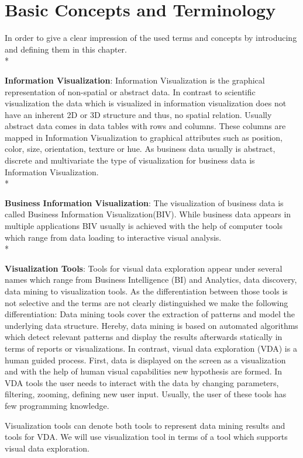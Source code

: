 \chapter{Basic Concepts and Terminology}
\label{concepts}
In order to give a clear impression of the used terms and concepts by introducing and defining them in this chapter.\\*

\textbf{Information Visualization}:
Information Visualization is the graphical representation of non-spatial or abstract data\cite{Keim}. In contrast to scientific visualization the data which is visualized in information visualization does not have an inherent 2D or 3D structure\cite{Shneiderman2008} and thus, no spatial relation. Usually abstract data comes in data tables with rows and columns. These columns are mapped in Information Visualization to graphical attributes such as position, color, size, orientation, texture or hue. 
As business data usually is abstract, discrete and multivariate\cite{Tegarden1999} the type of visualization for business data is Information Visualization.\\*

\textbf{Business Information Visualization}\label{BIV}:
The visualization of business data is called Business Information Visualization(BIV). While business data appears in multiple applications BIV usually is achieved with the help of computer tools which range from data loading to interactive visual analysis. \\*

\textbf{Visualization Tools}\label{tools}:
Tools for visual data exploration appear under several names which range from Business Intelligence (BI) and Analytics, data discovery, data mining to visualization tools. As the differentiation between those tools is not selective and the terms are not clearly distinguished we make the following differentiation:
Data mining tools cover the extraction of patterns and model the underlying data structure\cite{FerreiradeOliveira2003}. Hereby, data mining is based on automated algorithms which detect relevant patterns and display the results afterwards statically in terms of reports or visualizations. In contrast, visual data exploration (VDA) is a human guided process\cite{FerreiradeOliveira2003}. First, data is displayed on the screen as a visualization and with the help of human visual capabilities new hypothesis are formed. In VDA tools the user needs to interact with the data by changing parameters, filtering, zooming, defining new user input. Usually, the user of these tools has few programming knowledge.
\iffalse
Data visualization is a more general term for generating a graphical representation out of data and is used in BI, Analytics, data discovery and in visual analytics.
\fi
Visualization tools can denote both tools to represent data mining results and tools for VDA. We will use visualization tool in terms of a tool which supports visual data exploration. 



